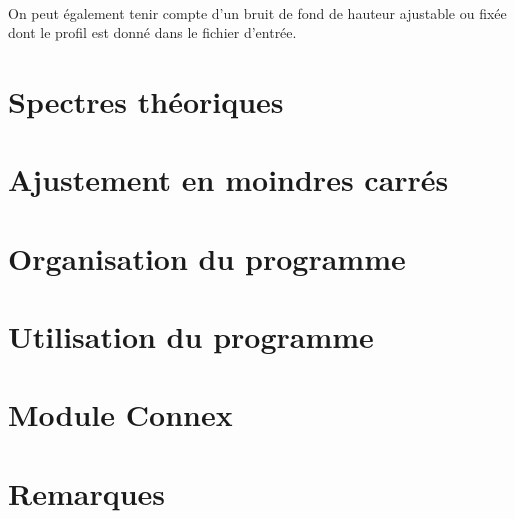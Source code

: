 \documentclass[a4paper]{article}
\begin{document}
\paragraph{}
On peut également tenir compte d'un bruit de fond de hauteur ajustable ou fixée dont le profil est donné dans le fichier d'entrée.
\newpage
\tableofcontents
\newpage
\section{Spectres théoriques}

\FloatBarrier

\FloatBarrier
\section{Ajustement en moindres carrés}

\newpage
\section{Organisation du programme}

\newpage
\section{Utilisation du programme}


\newpage
\section{Module Connex}

\newpage
\section{Remarques}

\newpage


\end{document}
